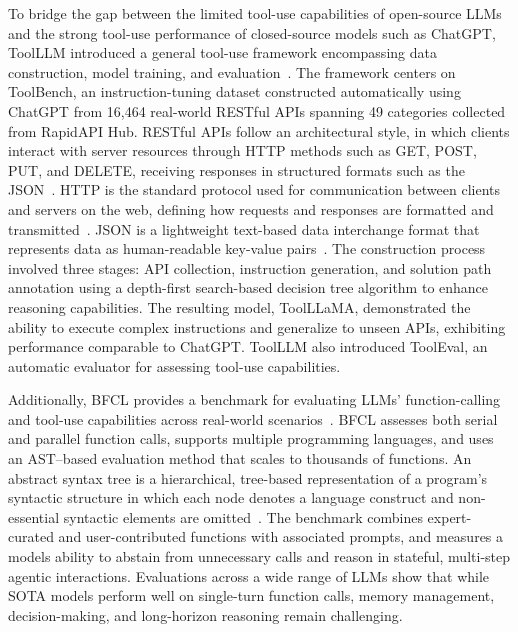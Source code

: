 \documentclass[
english,                 %
bibtex,                  %
includeExtraAbstracts, %
]{kththesis}
\numberwithin{listing}{chapter}
\begin{document}
To bridge the gap between the limited tool-use capabilities of open-source \glspl{LLM} and the strong tool-use performance of closed-source models such as Chat\gls{GPT}, Tool\gls{LLM} introduced a general tool-use framework encompassing data construction, model training, and evaluation~\cite{qin_toolllm_2024}. The framework centers on ToolBench, an instruction-tuning dataset constructed automatically using Chat\gls{GPT} from 16,464 real-world \gls{REST}ful \glspl{API} spanning 49 categories collected from Rapid\gls{API} Hub. \Gls{REST}ful \glspl{API} follow an architectural style, in which clients interact with server resources through \gls{HTTP} methods such as GET, POST, PUT, and DELETE, receiving responses in structured formats such as the \gls{JSON}~\cite{fielding_architectural_2000}. \Gls{HTTP} is the standard protocol used for communication between clients and servers on the web, defining how requests and responses are formatted and transmitted~\cite{berners-lee_information_1990}. \Gls{JSON} is a lightweight text-based data interchange format that represents data as human-readable key-value pairs~\cite{crockford_applicationjson_2006}. The construction process involved three stages: \gls{API} collection, instruction generation, and solution path annotation using a depth-first search-based decision tree algorithm to enhance reasoning capabilities. The resulting model, Tool\gls{LLaMA}, demonstrated the ability to execute complex instructions and generalize to unseen \glspl{API}, exhibiting performance comparable to Chat\gls{GPT}. Tool\gls{LLM} also introduced ToolEval, an automatic evaluator for assessing tool-use capabilities.

Additionally, \gls{BFCL} provides a benchmark for evaluating \glspl{LLM}’ function-calling and tool-use capabilities across real-world scenarios~\cite{patil_berkeley_2025}. \Gls{BFCL} assesses both serial and parallel function calls, supports multiple programming languages, and uses an \gls{AST}–based evaluation method that scales to thousands of functions. An abstract syntax tree is a hierarchical, tree-based representation of a program’s syntactic structure in which each node denotes a language construct and non-essential syntactic elements are omitted~\cite{perry_foundations_1992}. The benchmark combines expert-curated and user-contributed functions with associated prompts, and measures a models ability to abstain from unnecessary calls and reason in stateful, multi-step agentic interactions. Evaluations across a wide range of \glspl{LLM} show that while \gls{SOTA} models perform well on single-turn function calls, memory management, decision-making, and long-horizon reasoning remain challenging.
\end{document}
